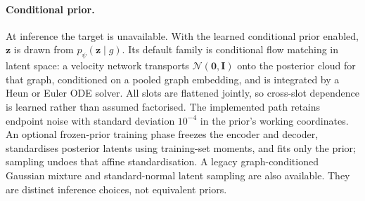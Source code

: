 \paragraph{Conditional prior.}
At inference the target is unavailable. With the learned conditional prior
enabled, $\mathbf{z}$ is drawn from $p_\psi(\mathbf{z}\mid g)$. Its default family is conditional
flow matching in latent space: a velocity network transports
$\mathcal{N}(\mathbf{0},\mathbf{I})$ onto the posterior cloud for that graph,
conditioned on a pooled graph embedding, and is integrated by a Heun or Euler
ODE solver. All slots are flattened jointly, so cross-slot dependence is
learned rather than assumed factorised. The implemented path retains endpoint
noise with standard deviation $10^{-4}$ in the prior's working coordinates.
An optional frozen-prior training phase freezes the encoder and decoder,
standardises posterior latents using training-set moments, and fits only the
prior; sampling undoes that affine standardisation. A legacy
graph-conditioned Gaussian mixture and standard-normal latent sampling are
also available. They are distinct inference choices, not equivalent priors.

